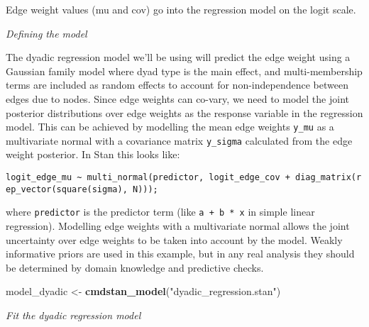\documentclass[
]{article}
\newenvironment{Shaded}{\begin{snugshade}}{\end{snugshade}}
\newcommand{\FunctionTok}[1]{\textcolor[rgb]{0.13,0.29,0.53}{\textbf{#1}}}
\newcommand{\NormalTok}[1]{#1}
\newcommand{\OtherTok}[1]{\textcolor[rgb]{0.56,0.35,0.01}{#1}}
\newcommand{\StringTok}[1]{\textcolor[rgb]{0.31,0.60,0.02}{#1}}
\begin{document}
Edge weight values (mu and cov) go into the regression model on the
logit scale.

\emph{Defining the model}

The dyadic regression model we'll be using will predict the edge weight
using a Gaussian family model where dyad type is the main effect, and
multi-membership terms are included as random effects to account for
non-independence between edges due to nodes. Since edge weights can
co-vary, we need to model the joint posterior distributions over edge
weights as the response variable in the regression model. This can be
achieved by modelling the mean edge weights \texttt{y\_mu} as a
multivariate normal with a covariance matrix \texttt{y\_sigma}
calculated from the edge weight posterior. In Stan this looks like:

\texttt{logit\_edge\_mu\ \textasciitilde{}\ multi\_normal(predictor,\ logit\_edge\_cov\ +\ diag\_matrix(rep\_vector(square(sigma),\ N)));}

where \texttt{predictor} is the predictor term (like
\texttt{a\ +\ b\ *\ x} in simple linear regression). Modelling edge
weights with a multivariate normal allows the joint uncertainty over
edge weights to be taken into account by the model. Weakly informative
priors are used in this example, but in any real analysis they should be
determined by domain knowledge and predictive checks.

\begin{Shaded}
\begin{Highlighting}[]
\NormalTok{model\_dyadic }\OtherTok{\textless{}{-}} \FunctionTok{cmdstan\_model}\NormalTok{(}\StringTok{"dyadic\_regression.stan"}\NormalTok{)}
\end{Highlighting}
\end{Shaded}

\emph{Fit the dyadic regression model}
\end{document}
